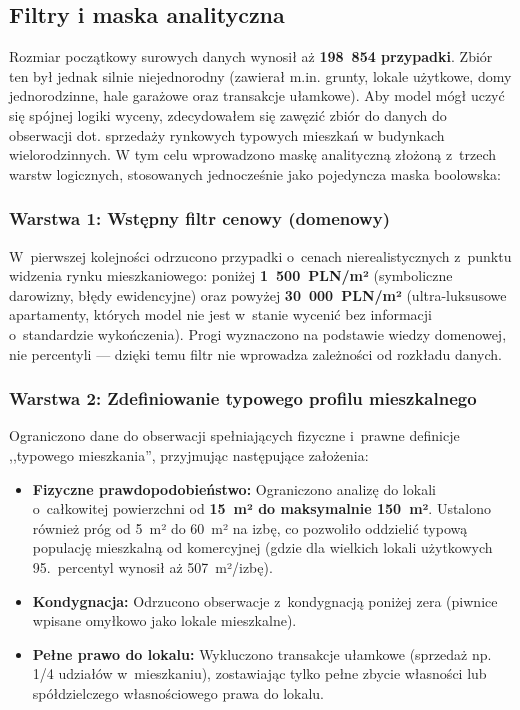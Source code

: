 \documentclass[12pt,a4paper]{article}
\begin{document}
\subsection{Filtry i maska analityczna}

Rozmiar początkowy surowych danych wynosił aż \textbf{198~854 przypadki}. Zbiór ten był jednak silnie niejednorodny (zawierał m.in. grunty, lokale użytkowe, domy jednorodzinne, hale garażowe oraz transakcje ułamkowe). Aby model mógł uczyć się spójnej logiki wyceny, zdecydowałem się zawęzić zbiór do danych do obserwacji dot. sprzedaży rynkowych typowych mieszkań w budynkach wielorodzinnych. W tym celu wprowadzono maskę analityczną złożoną z~trzech warstw logicznych, stosowanych jednocześnie jako pojedyncza maska boolowska:

\subsubsection*{Warstwa 1: Wstępny filtr cenowy (domenowy)}
W~pierwszej kolejności odrzucono przypadki o~cenach nierealistycznych z~punktu widzenia rynku mieszkaniowego: poniżej \textbf{1~500~PLN/m²} (symboliczne darowizny, błędy ewidencyjne) oraz powyżej \textbf{30~000~PLN/m²} (ultra-luksusowe apartamenty, których model nie jest w~stanie wycenić bez informacji o~standardzie wykończenia). Progi wyznaczono na podstawie wiedzy domenowej, nie percentyli --- dzięki temu filtr nie wprowadza zależności od rozkładu danych.

\subsubsection*{Warstwa 2: Zdefiniowanie typowego profilu mieszkalnego}
Ograniczono dane do obserwacji spełniających fizyczne i~prawne definicje ,,typowego mieszkania'', przyjmując następujące założenia:
\begin{itemize}
    \item \textbf{Fizyczne prawdopodobieństwo:} Ograniczono analizę do lokali o~całkowitej powierzchni od \textbf{15~m² do maksymalnie 150~m²}. Ustalono również próg od 5~m² do 60~m² na izbę, co pozwoliło oddzielić typową populację mieszkalną od komercyjnej (gdzie dla wielkich lokali użytkowych 95.\ percentyl wynosił aż 507~m²/izbę).
    \item \textbf{Kondygnacja:} Odrzucono obserwacje z~kondygnacją poniżej zera (piwnice wpisane omyłkowo jako lokale mieszkalne).
    \item \textbf{Pełne prawo do lokalu:} Wykluczono transakcje ułamkowe (sprzedaż np. 1/4 udziałów w~mieszkaniu), zostawiając tylko pełne zbycie własności lub spółdzielczego własnościowego prawa do lokalu.
\end{itemize}
\end{document}
